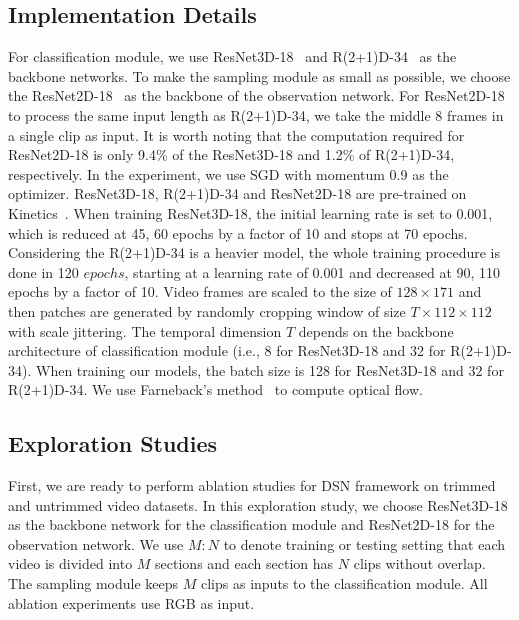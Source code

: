 \documentclass[journal]{IEEEtran}
\begin{document}
\subsection{Implementation Details}
For classification module, we use ResNet3D-18~\cite{abs-1708-05038} and R(2+1)D-34~\cite{R2+1D} as the backbone networks.
To make the sampling module as small as possible, we choose the ResNet2D-18~\cite{R2+1D} as the backbone of the observation network.
For ResNet2D-18 to process the same input length as R(2+1)D-34, we take the middle 8 frames in a single clip as input.
It is worth noting that the computation required for ResNet2D-18 is only 9.4\% of the ResNet3D-18 and 1.2\% of R(2+1)D-34, respectively.
In the experiment, we use SGD with momentum 0.9 as the optimizer.
ResNet3D-18, R(2+1)D-34 and ResNet2D-18 are pre-trained on Kinetics~\cite{CarreiraZ17}.
When training ResNet3D-18, the initial learning rate is set to 0.001, which is reduced at 45, 60 epochs by a factor of 10 and stops at 70 epochs.
Considering the R(2+1)D-34 is a heavier model, the whole training procedure is done in 120 $epochs$, starting at a learning rate of 0.001 and decreased at 90, 110 epochs by a factor of 10.
Video frames are scaled to the size of $128 \times171 $ and then patches are generated by randomly cropping window of size $ T \times 112\times112 $ with scale jittering.
The temporal dimension $T$ depends on the backbone architecture of classification module (i.e., 8 for ResNet3D-18 and 32 for R(2+1)D-34).
When training our models, the batch size is 128 for ResNet3D-18 and 32 for R(2+1)D-34.
We use Farneback’s method~\cite{optical-flow} to compute optical flow.


\subsection{Exploration Studies}
First, we are ready to perform ablation studies for DSN framework on trimmed and untrimmed video datasets.
In this exploration study, we choose ResNet3D-18 as the backbone network for the classification module and ResNet2D-18 for the observation network.
We use $M: N$ to denote training or testing setting that each video is divided into $M$ sections and each section has $N$ clips without overlap.
The sampling module keeps $M$ clips as inputs to the classification module.
All ablation experiments use RGB as input.
\end{document}
